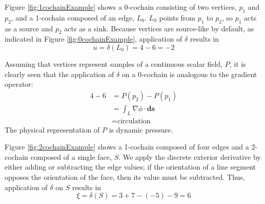 Figure \ref{fig:1cochainExample} shows a 0-cochain consisting of two vertices, $p_1$ and $p_2$, and a 1-cochain composed of an edge, $L_0$. $L_0$ points from $p_1$ to $p_2$, so $p_1$ acts as a source and $p_2$ acts as a sink. Because vertices are source-like by default, as indicated in Figure \ref{fig:0cochainExample}, application of $\delta$ results in
\begin{equation}
    u = \delta(L_0) = 4 - 6 = -2
\end{equation}

Assuming that vertices represent samples of a continuous scalar field, $P$, it is clearly seen that the application of $\delta$ on a 0-cochain is analogous to the gradient operator:
\begin{equation}
    \begin{split}
        4 - 6 &= P(p_2) - P(p_1) \\
        &= \int_{L} \nabla \phi \cdot \mathbf{ds} \\
        &= \mbox{circulation}
    \end{split}
\end{equation}
The physical representation of $P$ is dynamic pressure.

Figure \ref{fig:2cochainExample} shows a 1-cochain composed of four edges and a 2-cochain composed of a single face, $S$. We apply the discrete exterior derivative by either adding or subtracting the edge values; if the orientation of a line segment opposes the orientation of the face, then its value must be subtracted. Thus, application of $\delta$ on $S$ results in
\begin{equation}
    \xi = \delta(S) = 3 + 7 - (-5) - 9 = 6
\end{equation}

